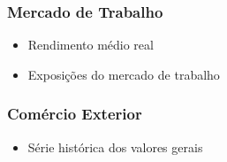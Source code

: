 \documentclass[12pt,aspectratio=169]{beamer}
\begin{document}
\begin{frame}
	\frametitle{Mercado de Trabalho}
	\begin{itemize}
		\item Rendimento médio real
		\item Exposições do mercado de trabalho
	\end{itemize}
	
	\begin{figure}%
		\centering
		\qquad
		
	\end{figure}
	
	
\end{frame}



\begin{frame}
	\frametitle{Comércio Exterior}
	\begin{itemize}
		\item Série histórica dos valores gerais
	\end{itemize}

\begin{figure}%
	\centering
	
\end{figure}
\end{frame}
\end{document}
